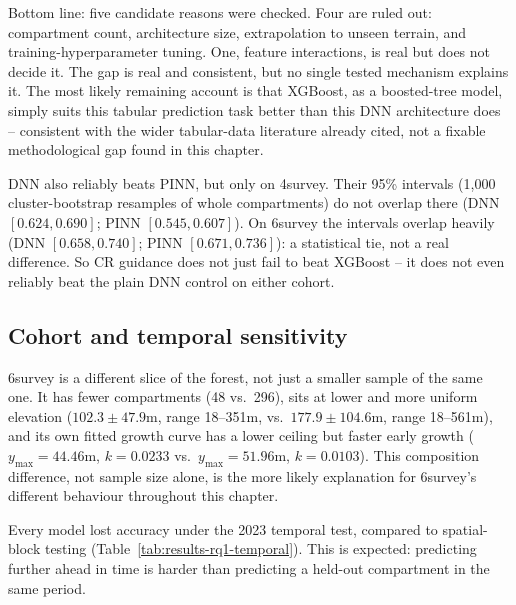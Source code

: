 Bottom line: five candidate reasons were checked. Four are ruled out: compartment count,
architecture size, extrapolation to unseen terrain, and training-hyperparameter tuning. One,
feature interactions, is real but does not decide it. The gap is real and consistent, but no
single tested mechanism explains it. The most likely remaining account is that XGBoost, as a
boosted-tree model, simply suits this tabular prediction task better than this DNN architecture
does -- consistent with the wider tabular-data literature already cited, not a fixable
methodological gap found in this chapter.

DNN also reliably beats PINN, but only on 4survey. Their 95\% intervals (1{,}000 cluster-bootstrap
resamples of whole compartments) do not overlap there (DNN $[0.624,0.690]$; PINN $[0.545,0.607]$).
On 6survey the intervals overlap heavily (DNN $[0.658,0.740]$; PINN $[0.671,0.736]$): a
statistical tie, not a real difference. So CR guidance does not just fail to beat XGBoost -- it
does not even reliably beat the plain DNN control on either cohort.


\subsection{Cohort and temporal sensitivity}

6survey is a different slice of the forest, not just a smaller sample of the same one. It has
fewer compartments (48 vs.\ 296), sits at lower and more uniform elevation ($102.3\pm47.9$m,
range 18--351m, vs.\ $177.9\pm104.6$m, range 18--561m), and its own fitted growth curve has a
lower ceiling but faster early growth ($y_{\max}=44.46$m, $k=0.0233$ vs.\ $y_{\max}=51.96$m,
$k=0.0103$). This composition difference, not sample size alone, is the more likely explanation
for 6survey's different behaviour throughout this chapter.

Every model lost accuracy under the 2023 temporal test, compared to spatial-block testing
(Table~\ref{tab:results-rq1-temporal}). This is expected: predicting further ahead in time is
harder than predicting a held-out compartment in the same period.

